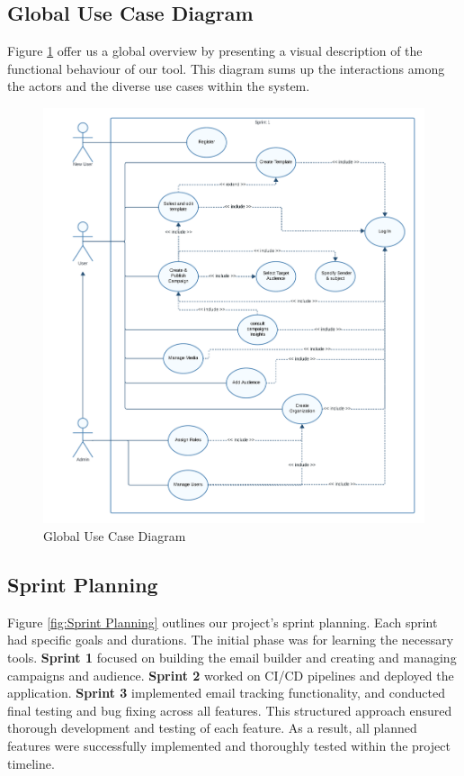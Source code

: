 \clearpage
\subsection{Global Use Case Diagram}
Figure \ref{fig:Global Use Case Diagram} offer us a global overview by presenting a visual description of the functional
behaviour of our tool. This diagram sums up the interactions among the actors and the
diverse use cases within the system.

\begin{figure}[ht]
	\centering
	\includegraphics[width=\linewidth]{Images//images/global use case diag.png}
	\caption{Global Use Case Diagram}
	\label{fig:Global Use Case Diagram}
\end{figure}

\newpage

\subsection{Sprint Planning}

Figure \ref{fig:Sprint Planning} outlines our project's sprint planning. Each sprint had specific goals and durations. The initial phase was for learning the necessary tools. \textbf{Sprint 1} focused on building the email builder and creating and managing campaigns and audience. \textbf{Sprint 2} worked on CI/CD pipelines and deployed the application. \textbf{Sprint 3} implemented email tracking functionality, and conducted final testing and bug fixing across all features. This structured approach ensured thorough development and testing of each feature. As a result, all planned features were successfully implemented and thoroughly tested within the project timeline.

